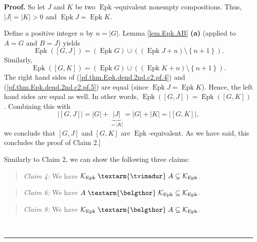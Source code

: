 \documentclass[numbers=enddot,12pt,final,onecolumn,notitlepage]{scrartcl}%
\theoremstyle{definition}
\newenvironment{statement}{\begin{quote}}{\end{quote}}
\newenvironment{proof}[1][Proof]{\noindent\textbf{#1.} }{\ \rule{0.5em}{0.5em}}
\newenvironment{verlong}{}{}
\newcommand{\tvi}{\left. \textarm{\tvimadur} \right.}
\newcommand{\bel}{\left. \textarm{\belgthor} \right.}
\begin{document}
\begin{verlong}
\begin{proof}
So let $J$ and $K$ be two $\operatorname*{Epk}$-equivalent nonempty
compositions. Thus, $\left\vert J\right\vert =\left\vert K\right\vert >0$ and
$\operatorname*{Epk}J=\operatorname*{Epk}K$.

Define a positive integer $n$ by $n=\left\vert G\right\vert $. Lemma
\ref{lem.Epk.AB} \textbf{(a)} (applied to $A=G$ and $B=J$) yields
\begin{equation}
\operatorname*{Epk}\left(  \left[  G,J\right]  \right)  =\left(
\operatorname*{Epk}G\right)  \cup\left(  \left(  \operatorname*{Epk}%
J+n\right)  \setminus\left\{  n+1\right\}  \right)  .
\label{pf.thm.Epk.dend.2nd.c2.pf.4}%
\end{equation}
Similarly,%
\begin{equation}
\operatorname*{Epk}\left(  \left[  G,K\right]  \right)  =\left(
\operatorname*{Epk}G\right)  \cup\left(  \left(  \operatorname*{Epk}%
K+n\right)  \setminus\left\{  n+1\right\}  \right)  .
\label{pf.thm.Epk.dend.2nd.c2.pf.5}%
\end{equation}
The right hand sides of (\ref{pf.thm.Epk.dend.2nd.c2.pf.4}) and
(\ref{pf.thm.Epk.dend.2nd.c2.pf.5}) are equal (since $\operatorname*{Epk}%
J=\operatorname*{Epk}K$). Hence, the left hand sides are equal as well. In
other words, $\operatorname*{Epk}\left(  \left[  G,J\right]  \right)
=\operatorname*{Epk}\left(  \left[  G,K\right]  \right)  $. Combining this
with%
\[
\left\vert \left[  G,J\right]  \right\vert =\left\vert G\right\vert
+\underbrace{\left\vert J\right\vert }_{=\left\vert K\right\vert }=\left\vert
G\right\vert +\left\vert K\right\vert =\left\vert \left[  G,K\right]
\right\vert ,
\]
we conclude that $\left[  G,J\right]  $ and $\left[  G,K\right]  $ are
$\operatorname*{Epk}$-equivalent. As we have said, this concludes the proof of
Claim 2.]

Similarly to Claim 2, we can show the following three claims:

\begin{statement}
\textit{Claim 4:} We have $\mathcal{K}_{\operatorname*{Epk}}\tvi
A\subseteq\mathcal{K}_{\operatorname*{Epk}}$.
\end{statement}

\begin{statement}
\textit{Claim 6:} We have $A\bel\mathcal{K}_{\operatorname*{Epk}}%
\subseteq\mathcal{K}_{\operatorname*{Epk}}$.
\end{statement}

\begin{statement}
\textit{Claim 8:} We have $\mathcal{K}_{\operatorname*{Epk}}\bel
A\subseteq\mathcal{K}_{\operatorname*{Epk}}$.
\end{statement}


\end{proof}
\end{verlong}
\end{document}
